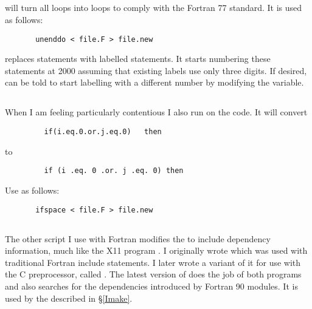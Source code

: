 \subsection{}
 will turn all  loops into
 loops to comply with the Fortran 77 standard.  It is
used as follows:
\begin{verbatim}
       unenddo < file.F > file.new
\end{verbatim}
 replaces  statements with labelled
 statements.  It starts numbering these statements at
2000 assuming that existing labels use only three digits.  If
desired,  can be told to start labelling with a
different number by modifying the 
variable.

\subsection{}
When I am feeling particularly contentious I also run  on
the code.  It will convert
\begin{verbatim}
         if(i.eq.0.or.j.eq.0)   then
\end{verbatim}
to
\begin{verbatim}
         if (i .eq. 0 .or. j .eq. 0) then
\end{verbatim}
Use as follows:
\begin{verbatim}
       ifspace < file.F > file.new
\end{verbatim}

\subsection{}
\label{sfm}
The other  script I use with Fortran modifies the
 to include dependency information, much like the X11
program .  I originally wrote  which
was used with traditional Fortran include statements.
I later wrote a variant of it for use with the C preprocessor,
called .  The latest version of
 does the job of both programs and also searches for
the dependencies introduced by Fortran 90 modules.  It is used by the
 described in \S\ref{Imake}.

